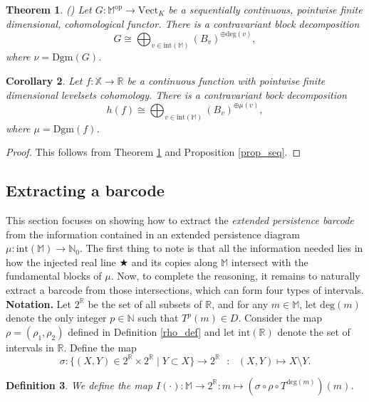 \documentclass[11pt]{article}
\newtheorem{theorem}{Theorem}[section]
\newtheorem{corollary}[theorem]{Corollary}
\newtheorem{definition}[theorem]{Definition}
\theoremstyle{remark}
\newcommand{\N}{\mathbb{N}}
\newcommand{\R}{\mathbb{R}}
\newcommand{\M}{\mathbb{M}}
\begin{document}
\begin{theorem}(\autocite[Corollary~3.5]{bauer2021structure})
\label{decomposition_thm}
 Let $G:\M^{\mathrm{op}}\rightarrow\mathrm{Vect}_K$ be a sequentially continuous, pointwise finite dimensional, cohomological functor. There is a contravariant block decomposition $$G\cong \bigoplus_{v\in\mathrm{int}(\M)} (B_v)^{\oplus\mathrm{deg}(v)},$$
where $\nu=\mathrm{Dgm}(G)$.
\end{theorem}

\begin{corollary}
Let $f:\mathbb{X}\longrightarrow \R$ be a continuous function with pointwise finite dimensional levelsets cohomology. There is a contravariant bock decomposition $$h(f)\cong \bigoplus_{v\in\mathrm{int}(\M)} (B_v)^{\oplus\mu(v)},$$
where $\mu=\mathrm{Dgm}(f)$.
\end{corollary}

\begin{proof}
This follows from Theorem \ref{decomposition_thm} and Proposition \ref{prop_seq}.
\end{proof}


\subsection{Extracting a barcode}
\label{extract}

This section focuses on showing how to extract the \textit{extended persistence barcode} from the information contained in an extended persistence diagram $\mu:\mathrm{int}(\M)\rightarrow\N_0$. The first thing to note is that all the information needed lies in how the injected real line $\bigstar$ and its copies along $\M$ intersect with the fundamental blocks of $\mu$. Now, to complete the reasoning, it remains to naturally extract a barcode from those intersections, which can form four types of intervals.\\

\noindent \textbf{Notation.} Let $2^\R$ be the set of all subsets of $\R$, and for any $m\in\M$, let $\mathrm{deg}(m)$ denote the only integer $p\in\N$ such that $T^p(m)\in D$. Consider the map $\rho=(\rho_1,\rho_2)$ defined in Definition \ref{rho_def} and let $\mathrm{int}(\R)$ denote the set of intervals in $\R$. Define the map 
$$\sigma:\{(X,Y)\in 2^\R\times2^\R\mid Y\subset X\}\longrightarrow 2^\R\text{ }: \text{ }(X,Y)\mapsto X\setminus Y.$$




\begin{definition}
We define the map $I(\cdot):\M\rightarrow 2^\R:m\mapsto (\sigma\circ \rho\circ T^{\mathrm{deg}(m)})(m)$. 
\end{definition}
\end{document}
